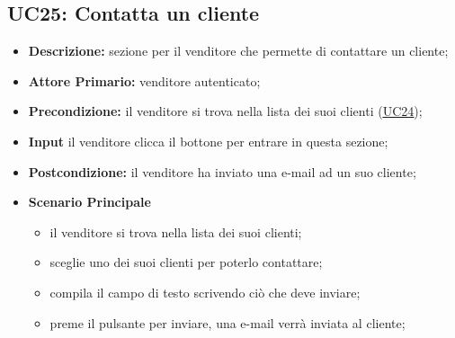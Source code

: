 \subsection{UC25: Contatta un cliente}
\label{sec:UC25}
\begin{itemize}
    \item \textbf{Descrizione:} sezione per il venditore che permette di contattare un cliente;
    \item \textbf{Attore Primario:} venditore autenticato;
    \item \textbf{Precondizione:} il venditore si trova nella lista dei suoi clienti (\hyperref[sec:UC24]{\underline{UC24}});
    \item \textbf{Input} il venditore clicca il bottone per entrare in questa sezione;
    \item \textbf{Postcondizione:} il venditore ha inviato una e-mail ad un suo cliente;
    \item \textbf{Scenario Principale}
          \begin{itemize}
              \item il venditore si trova nella lista dei suoi clienti;
              \item sceglie uno dei suoi clienti per poterlo contattare;
              \item compila il campo di testo scrivendo ciò che deve inviare;
              \item preme il pulsante per inviare, una e-mail verrà inviata al cliente;
          \end{itemize}
\end{itemize}